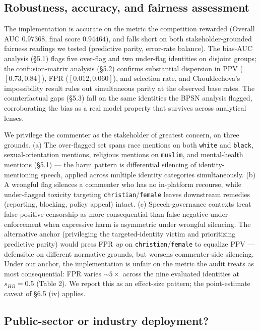 \documentclass[11pt]{article}
\begin{document}
\subsection{Robustness, accuracy, and fairness assessment}

The implementation is accurate on the metric the competition rewarded (Overall AUC $0.97368$, final score $0.94464$), and falls short on both stakeholder-grounded fairness readings we tested (predictive parity, error-rate balance). The bias-AUC analysis (\S5.1) flags five over-flag and two under-flag identities on disjoint groups; the confusion-matrix analysis (\S5.2) confirms substantial dispersion in PPV ($[0.73, 0.84]$), FPR ($[0.012, 0.060]$), and selection rate, and Chouldechova's impossibility result rules out simultaneous parity at the observed base rates. The counterfactual gaps (\S5.3) fall on the same identities the BPSN analysis flagged, corroborating the bias as a real model property that survives across analytical lenses.

We privilege the commenter as the stakeholder of greatest concern, on three grounds. (a) The over-flagged set spans race mentions on both \texttt{white} and \texttt{black}, sexual-orientation mentions, religious mentions on \texttt{muslim}, and mental-health mentions (\S5.1) --- the harm pattern is differential silencing of identity-mentioning speech, applied across multiple identity categories simultaneously. (b) A wrongful flag silences a commenter who has no in-platform recourse, while under-flagged toxicity targeting \texttt{christian}/\texttt{female} leaves downstream remedies (reporting, blocking, policy appeal) intact. (c) Speech-governance contexts treat false-positive censorship as more consequential than false-negative under-enforcement when expressive harm is asymmetric under wrongful silencing. The alternative anchor (privileging the targeted-identity victim and prioritizing predictive parity) would press FPR \emph{up} on \texttt{christian}/\texttt{female} to equalize PPV --- defensible on different normative grounds, but worsens commenter-side silencing. Under our anchor, the implementation is unfair on the metric the audit treats as most consequential: FPR varies $\sim 5\times$ across the nine evaluated identities at $s_{HR} = 0.5$ (Table 2). We report this as an effect-size pattern; the point-estimate caveat of \S6.5 (iv) applies.

\subsection{Public-sector or industry deployment?}
\end{document}
